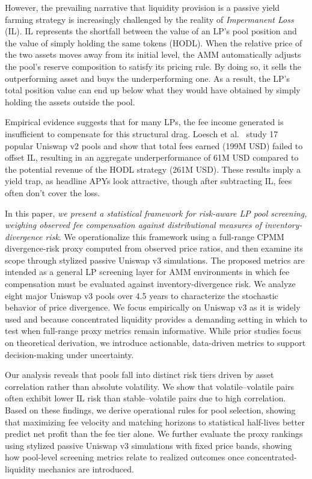 \documentclass[anonymous]{lipics-v2021}
\begin{document}
However, the prevailing narrative that liquidity provision is a passive yield farming strategy is increasingly challenged by the reality of \textit{Impermanent Loss} (IL). IL represents the shortfall between the value of an LP’s pool position and the value of simply holding the same tokens (HODL). When the relative price of the two assets moves away from its initial level, the AMM automatically adjusts the pool’s reserve composition to satisfy its pricing rule. 
By doing so, it sells the outperforming asset and buys the underperforming one. 
As a result, the LP's total position value can end up below what they would have obtained by simply holding the assets outside the pool.

Empirical evidence suggests that for many LPs, the fee income generated is insufficient to compensate for this structural drag. 
Loesch et al.~\cite{loesch2021impermanent} study 17 popular Uniswap v2 pools and show that total fees earned (199M USD) failed to offset IL, resulting in an aggregate underperformance of 61M USD compared to the potential revenue of the HODL strategy (261M USD). 
These results imply a yield trap, as headline APYs look attractive, though after subtracting IL, fees often don’t cover the loss.

In this paper, \textit{we present a statistical framework for risk-aware LP pool screening, weighing observed fee compensation against distributional measures of inventory-divergence risk}. 
We operationalize this framework using a full-range CPMM divergence-risk proxy computed from observed price ratios, and then examine its scope through stylized passive Uniswap v3 simulations.
The proposed metrics are intended as a general LP screening layer for AMM environments in which fee compensation must be evaluated against inventory-divergence risk.
We analyze eight major Uniswap v3 pools over 4.5 years to characterize the stochastic behavior of price divergence. 
We focus empirically on Uniswap v3 as it is widely used and because concentrated liquidity provides a demanding setting in which to test when full-range proxy metrics remain informative.
While prior studies focus on theoretical derivation, we introduce actionable, data-driven metrics to support decision-making under uncertainty.

Our analysis reveals that pools fall into distinct risk tiers driven by asset correlation rather than absolute volatility. We show that volatile--volatile pairs often exhibit lower IL risk than stable--volatile pairs due to high correlation. Based on these findings, we derive operational rules for pool selection, showing that maximizing fee velocity and matching horizons to statistical half-lives better predict net profit than the fee tier alone.
We further evaluate the proxy rankings using stylized passive Uniswap v3 simulations with fixed price bands, showing how pool-level screening metrics relate to realized outcomes once concentrated-liquidity mechanics are introduced.
\end{document}
